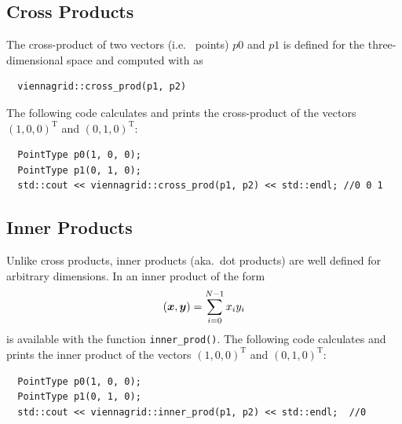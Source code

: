   \subsection{Cross Products}
 The cross-product of two vectors (i.e.~{\ViennaGrid} points) $p0$ and $p1$ is defined for the three-dimensional space and computed with {\ViennaGrid} as
 \begin{lstlisting}
  viennagrid::cross_prod(p1, p2)
 \end{lstlisting}
 The following code calculates and prints the cross-product of the vectors $(1,0,0)^\mathrm{T}$ and $(0,1,0)^\mathrm{T}$:
 \begin{lstlisting}
  PointType p0(1, 0, 0);
  PointType p1(0, 1, 0);
  std::cout << viennagrid::cross_prod(p1, p2) << std::endl; //0 0 1
 \end{lstlisting}

  

  \subsection{Inner Products}
 Unlike cross products, inner products (aka.~dot products) are well defined for arbitrary dimensions. In {\ViennaGridversion} an inner product of the form
\begin{align}
 (\boldsymbol{x}, \boldsymbol{y}) = \sum_{i=0}^{N-1} x_i y_i
\end{align}
is available with the function \lstinline|inner_prod()|. The following code calculates and prints the inner product of the vectors $(1,0,0)^\mathrm{T}$ and $(0,1,0)^\mathrm{T}$:
 \begin{lstlisting}
  PointType p0(1, 0, 0);
  PointType p1(0, 1, 0);
  std::cout << viennagrid::inner_prod(p1, p2) << std::endl;  //0
 \end{lstlisting}
 

